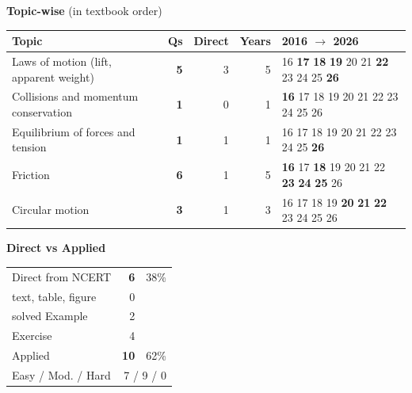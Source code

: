 {\small\textbf{\color{crimson}Topic-wise} (in textbook order)\par\smallskip
\begin{tabularx}{\linewidth}{@{}>{\raggedright\arraybackslash}Xrrrl@{}}\toprule
Topic & Qs & Direct & Years & 2016 $\rightarrow$ 2026\\\midrule
Laws of motion (lift, apparent weight) & \textbf{5} & 3 & 5 & {\scriptsize {\color{gray!45}16} \textbf{17} \textbf{18} \textbf{19} {\color{gray!45}20} {\color{gray!45}21} \textbf{22} {\color{gray!45}23} {\color{gray!45}24} {\color{gray!45}25} \textbf{26}}\\
Collisions and momentum conservation & \textbf{1} & 0 & 1 & {\scriptsize \textbf{16} {\color{gray!45}17} {\color{gray!45}18} {\color{gray!45}19} {\color{gray!45}20} {\color{gray!45}21} {\color{gray!45}22} {\color{gray!45}23} {\color{gray!45}24} {\color{gray!45}25} {\color{gray!45}26}}\\
Equilibrium of forces and tension & \textbf{1} & 1 & 1 & {\scriptsize {\color{gray!45}16} {\color{gray!45}17} {\color{gray!45}18} {\color{gray!45}19} {\color{gray!45}20} {\color{gray!45}21} {\color{gray!45}22} {\color{gray!45}23} {\color{gray!45}24} {\color{gray!45}25} \textbf{26}}\\
Friction & \textbf{6} & 1 & 5 & {\scriptsize \textbf{16} {\color{gray!45}17} \textbf{18} {\color{gray!45}19} {\color{gray!45}20} {\color{gray!45}21} {\color{gray!45}22} \textbf{23} \textbf{24} \textbf{25} {\color{gray!45}26}}\\
Circular motion & \textbf{3} & 1 & 3 & {\scriptsize {\color{gray!45}16} {\color{gray!45}17} {\color{gray!45}18} {\color{gray!45}19} \textbf{20} \textbf{21} \textbf{22} {\color{gray!45}23} {\color{gray!45}24} {\color{gray!45}25} {\color{gray!45}26}}\\
\bottomrule\end{tabularx}}\par\medskip
\begin{minipage}[t]{0.34\linewidth}{\small\textbf{\color{crimson}Direct vs Applied}\par\smallskip
\begin{tabular}{@{}lrr@{}}\toprule
Direct from NCERT & \textbf{6} & 38\%\\
\quad text, table, figure & 0 &\\
\quad solved Example & 2 &\\
\quad Exercise & 4 &\\
Applied & \textbf{10} & 62\%\\\midrule
Easy / Mod. / Hard & \multicolumn{2}{r}{7 / 9 / 0}\\\bottomrule
\end{tabular}}\end{minipage}\hfill
